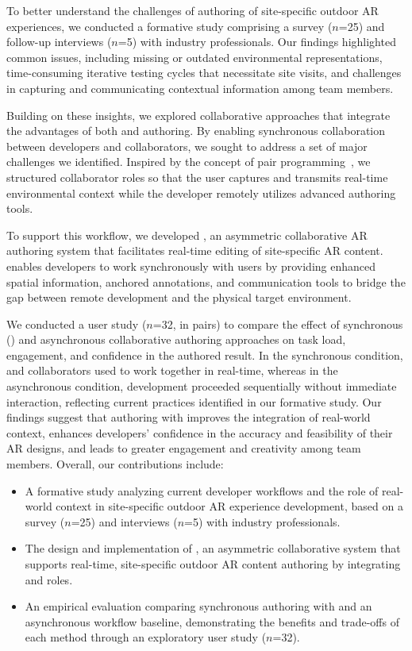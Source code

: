 To better understand the challenges of \exsitu authoring of site-specific outdoor AR experiences, we conducted a formative study comprising a survey ($n$=25) and follow-up interviews ($n$=5) with industry professionals. Our findings highlighted common issues, including missing or outdated environmental representations, time-consuming iterative testing cycles that necessitate site visits, and challenges in capturing and communicating contextual information among team members.

Building on these insights, we explored collaborative approaches that integrate the advantages of both \exsitu and \insitu authoring. By enabling synchronous collaboration between \exsitu developers and \insitu collaborators, we sought to address a set of major challenges we identified. Inspired by the concept of pair programming~\cite{hannayEffectivenessPairProgramming2009}, we structured collaborator roles so that the \insitu user captures and transmits real-time environmental context while the \exsitu developer remotely utilizes advanced authoring tools.

To support this workflow, we developed \SystemName, an asymmetric collaborative AR authoring system that facilitates real-time editing of site-specific AR content. \SystemName enables \exsitu developers to work synchronously with \insitu users by providing enhanced spatial information, anchored annotations, and communication tools to bridge the gap between remote development and the physical target environment.

We conducted a user study ($n$=32, in pairs) to compare the effect of synchronous (\SystemName) and asynchronous collaborative authoring approaches on task load, engagement, and confidence in the authored result. In the synchronous condition, \exsitu and \insitu collaborators used \SystemName to work together in real-time, whereas in the asynchronous condition, development proceeded sequentially without immediate interaction, reflecting current practices identified in our formative study. Our findings suggest that authoring with \SystemName improves the integration of real-world context, enhances developers' confidence in the accuracy and feasibility of their AR designs, and leads to greater engagement and creativity among team members. Overall, our contributions include:

\begin{itemize}
\item A formative study analyzing current developer workflows and the role of real-world context in site-specific outdoor AR experience development, based on a survey ($n$=25) and interviews ($n$=5) with industry professionals.
\item The design and implementation of \SystemName, an asymmetric collaborative system that supports real-time, site-specific outdoor AR content authoring by integrating \exsitu and \insitu roles.
\item An empirical evaluation comparing synchronous authoring with \SystemName and an asynchronous workflow baseline, demonstrating the benefits and trade-offs of each method through an exploratory user study ($n$=32).
\end{itemize}
